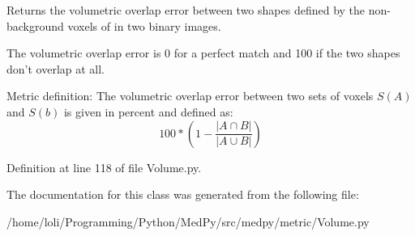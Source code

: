 Returns the volumetric overlap error between two shapes defined by the non-\/background voxels of in two binary images. 

The volumetric overlap error is 0 for a perfect match and 100 if the two shapes don't overlap at all.

Metric definition: The volumetric overlap error between two sets of voxels $S(A)$ and $S(b)$ is given in percent and defined as: \[ 100 * \left( 1 - \frac{|A\cap B|}{|A\cup B|} \right) \] 

Definition at line 118 of file Volume.py.



The documentation for this class was generated from the following file:\begin{DoxyCompactItemize}
\item 
/home/loli/Programming/Python/MedPy/src/medpy/metric/Volume.py\end{DoxyCompactItemize}
